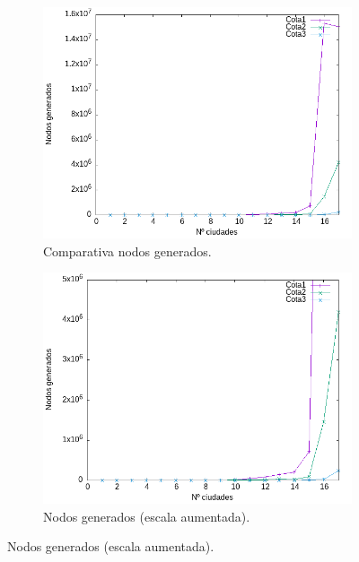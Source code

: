 \documentclass{article}
\begin{document}
\begin{figure}[H]
    \centering
    \begin{subfigure}[b]{0.45\textwidth}
        \centering
        \includegraphics[width=\textwidth]{Sucio_Olga/img/Comparativa_nodos_BB_linespoints.png}
        \caption{Comparativa nodos generados.}
    \end{subfigure}
    \begin{subfigure}[b]{0.45\textwidth}
        \centering
        \includegraphics[width=\textwidth]{Sucio_Olga/img/Comparativa_nodos_BB_linespointsAcotado.png}
        \caption{Nodos generados (escala aumentada).}
    \end{subfigure}
\end{figure} 
\end{document}
